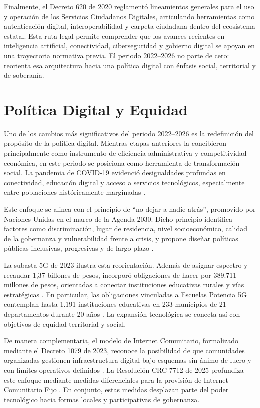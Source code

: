 \documentclass[9pt,letterpaper,twocolumn,twoside,apabib]{rho-class/rho}
\begin{document}
Finalmente, el Decreto 620 de 2020 \parencite{decreto_620_2020} reglamentó lineamientos generales para el uso y operación de los Servicios Ciudadanos Digitales, articulando herramientas como autenticación digital, interoperabilidad y carpeta ciudadana dentro del ecosistema estatal. Esta ruta legal permite comprender que los avances recientes en inteligencia artificial, conectividad, ciberseguridad y gobierno digital se apoyan en una trayectoria normativa previa. El periodo 2022--2026 no parte de cero: reorienta esa arquitectura hacia una política digital con énfasis social, territorial y de soberanía.


\section{Política Digital y Equidad}

Uno de los cambios más significativos del periodo 2022--2026 es la redefinición del propósito de la política digital. Mientras etapas anteriores la concibieron principalmente como instrumento de eficiencia administrativa y competitividad económica, en este periodo se posiciona como herramienta de transformación social. La pandemia de COVID-19 evidenció desigualdades profundas en conectividad, educación digital y acceso a servicios tecnológicos, especialmente entre poblaciones históricamente marginadas \parencite{cepal_universalizar_acceso_2020}.

Este enfoque se alinea con el principio de ``no dejar a nadie atrás'', promovido por Naciones Unidas en el marco de la Agenda 2030. Dicho principio identifica factores como discriminación, lugar de residencia, nivel socioeconómico, calidad de la gobernanza y vulnerabilidad frente a crisis, y propone diseñar políticas públicas inclusivas, progresivas y de largo plazo \parencite{unsceb_lnob_2017}.

La subasta 5G de 2023 ilustra esta reorientación. Además de asignar espectro y recaudar 1,37 billones de pesos, incorporó obligaciones de hacer por 389.711 millones de pesos, orientadas a conectar instituciones educativas rurales y vías estratégicas \parencite{mintic_5g_realidad_2023}. En particular, las obligaciones vinculadas a Escuelas Potencia 5G contemplan hasta 1.191 instituciones educativas en 233 municipios de 21 departamentos durante 20 años \parencite{mintic_escuelas_potencia_5g_2024}. La expansión tecnológica se conecta así con objetivos de equidad territorial y social.

De manera complementaria, el modelo de Internet Comunitario, formalizado mediante el Decreto 1079 de 2023, reconoce la posibilidad de que comunidades organizadas gestionen infraestructura digital bajo esquemas sin ánimo de lucro y con límites operativos definidos \parencite{funcionpublica_decreto_1079_2023}. La Resolución CRC 7712 de 2025 profundiza este enfoque mediante medidas diferenciales para la provisión de Internet Comunitario Fijo \parencite{crc_resolucion_7712_2025}. En conjunto, estas medidas desplazan parte del poder tecnológico hacia formas locales y participativas de gobernanza.
\end{document}

